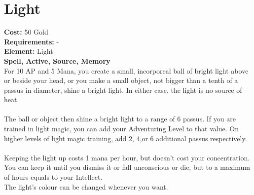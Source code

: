 \section{Light}
\textbf{Cost:} 50 Gold\\
\textbf{Requirements:} -\\
\textbf{Element:} Light\\
\textbf{Spell, Active, Source, Memory}\\
For 10 AP and 5 Mana, you create a small, incorporeal ball of bright light above or beside your head, or you make a small object, not bigger than a tenth of a passus in diameter, shine a bright light. In either case, the light is no source of heat.\\
\\
The ball or object then shine a bright light to a range of 6 passus. If you are trained in light magic, you can add your Adventuring Level to that value. On higher levels of light magic training, add 2, 4,or 6 additional passus respectively.\\
\\
Keeping the light up costs 1 mana per hour, but doesn't cost your concentration. You can keep it until you dismiss it or fall unconscious or die, but to a maximum of hours equals to your Intellect.
\\
The light's colour can be changed whenever you want.\\